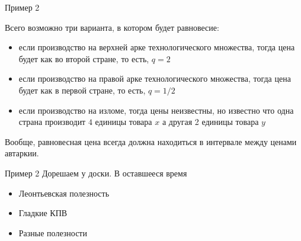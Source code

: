 \documentclass{beamer}
\begin{document}
\begin{frame}{Пример 2}

Всего возможно три варианта, в котором будет равновесие:

\begin{itemize}
  \item если производство на верхней арке технологического множества, тогда цена будет как во второй стране, то есть, $q = 2$
  \item если производство на правой арке технологического множества, тогда цена будет как в первой стране, то есть, $q = 1/2$
  \item если производство на изломе, тогда цены неизвестны, но известно что одна страна производит $4$ единицы товара $x$ а другая 2 единицы товара $y$
\end{itemize}
Вообще, \alert{равновесная цена всегда должна находиться в интервале между ценами автаркии}.

\end{frame}

\begin{frame}{Пример 2}
Дорешаем у доски. В оставшееся время

\begin{itemize}
  \item Леонтьевская полезность
  \item Гладкие КПВ
  \item Разные полезности
\end{itemize}
\end{frame}
\end{document}
